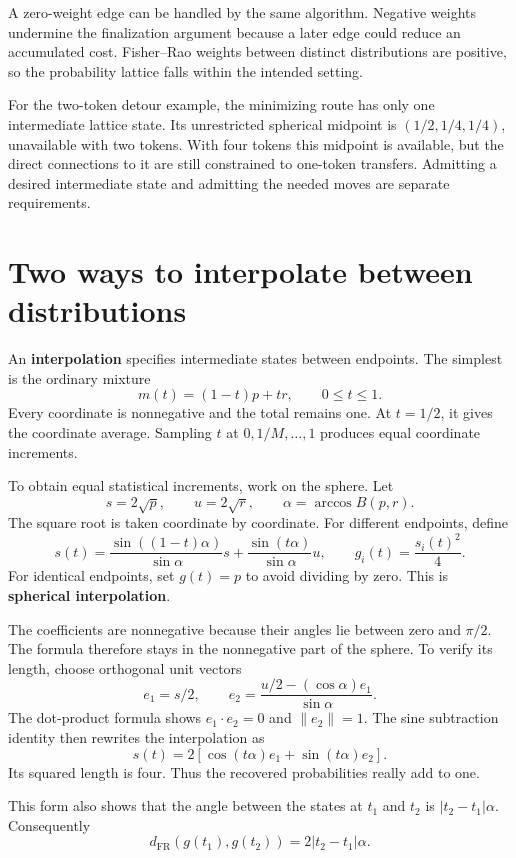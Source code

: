 \documentclass[11pt,oneside,openany]{book}
\theoremstyle{definition}
\theoremstyle{remark}
\numberwithin{equation}{chapter}
\begin{document}
A zero-weight edge can be handled by the same algorithm. Negative weights undermine the finalization argument because a later edge could reduce an accumulated cost. Fisher--Rao weights between distinct distributions are positive, so the probability lattice falls within the intended setting.

For the two-token detour example, the minimizing route has only one intermediate lattice state. Its unrestricted spherical midpoint is \((1/2,1/4,1/4)\), unavailable with two tokens. With four tokens this midpoint is available, but the direct connections to it are still constrained to one-token transfers. Admitting a desired intermediate state and admitting the needed moves are separate requirements.

\section{Two ways to interpolate between distributions}\label{ch08-two-ways-to-interpolate-between-distributions}

An \textbf{interpolation} specifies intermediate states between endpoints. The simplest is the ordinary mixture \[m(t)=(1-t)p+tr,\qquad 0\leq t\leq1.\] Every coordinate is nonnegative and the total remains one. At \(t=1/2\), it gives the coordinate average. Sampling \(t\) at \(0,1/M,\ldots,1\) produces equal coordinate increments.

To obtain equal statistical increments, work on the sphere. Let \[s=2\sqrt p,\qquad u=2\sqrt r,\qquad
\alpha=\arccos B(p,r).\] The square root is taken coordinate by coordinate. For different endpoints, define \[s(t)=\frac{\sin((1-t)\alpha)}{\sin\alpha}s
+\frac{\sin(t\alpha)}{\sin\alpha}u,\qquad
g_i(t)=\frac{s_i(t)^2}{4}.\] For identical endpoints, set \(g(t)=p\) to avoid dividing by zero. This is \textbf{spherical interpolation}.

The coefficients are nonnegative because their angles lie between zero and \(\pi/2\). The formula therefore stays in the nonnegative part of the sphere. To verify its length, choose orthogonal unit vectors \[e_1=s/2,\qquad
e_2=\frac{u/2-(\cos\alpha)e_1}{\sin\alpha}.\] The dot-product formula shows \(e_1\cdot e_2=0\) and \(\|e_2\|=1\). The sine subtraction identity then rewrites the interpolation as \[s(t)=2[\cos(t\alpha)e_1+\sin(t\alpha)e_2].\] Its squared length is four. Thus the recovered probabilities really add to one.

This form also shows that the angle between the states at \(t_1\) and \(t_2\) is \(|t_2-t_1|\alpha\). Consequently \[d_{\mathrm{FR}}(g(t_1),g(t_2))=2|t_2-t_1|\alpha.\]
\end{document}
